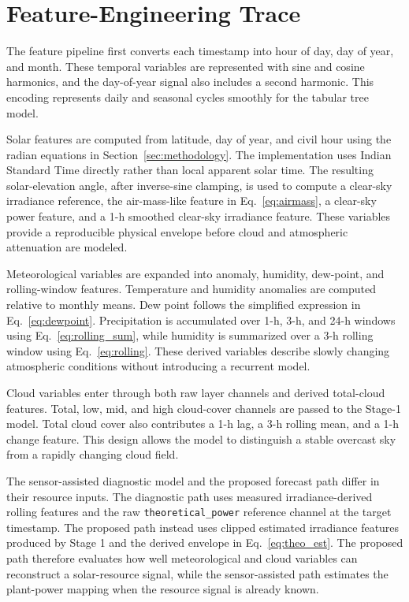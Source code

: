 \section{Feature-Engineering Trace}
\label{app:feature_trace}

The feature pipeline first converts each timestamp into hour of day, day of year, and month. These temporal variables are represented with sine and cosine harmonics, and the day-of-year signal also includes a second harmonic. This encoding represents daily and seasonal cycles smoothly for the tabular tree model.

Solar features are computed from latitude, day of year, and civil hour using the radian equations in Section~\ref{sec:methodology}. The implementation uses Indian Standard Time directly rather than local apparent solar time. The resulting solar-elevation angle, after inverse-sine clamping, is used to compute a clear-sky irradiance reference, the air-mass-like feature in Eq.~\eqref{eq:airmass}, a clear-sky power feature, and a 1-h smoothed clear-sky irradiance feature. These variables provide a reproducible physical envelope before cloud and atmospheric attenuation are modeled.

Meteorological variables are expanded into anomaly, humidity, dew-point, and rolling-window features. Temperature and humidity anomalies are computed relative to monthly means. Dew point follows the simplified expression in Eq.~\eqref{eq:dewpoint}. Precipitation is accumulated over 1-h, 3-h, and 24-h windows using Eq.~\eqref{eq:rolling_sum}, while humidity is summarized over a 3-h rolling window using Eq.~\eqref{eq:rolling}. These derived variables describe slowly changing atmospheric conditions without introducing a recurrent model.

Cloud variables enter through both raw layer channels and derived total-cloud features. Total, low, mid, and high cloud-cover channels are passed to the Stage-1 model. Total cloud cover also contributes a 1-h lag, a 3-h rolling mean, and a 1-h change feature. This design allows the model to distinguish a stable overcast sky from a rapidly changing cloud field.

The sensor-assisted diagnostic model and the proposed forecast path differ in their resource inputs. The diagnostic path uses measured irradiance-derived rolling features and the raw \texttt{theoretical\_power} reference channel at the target timestamp. The proposed path instead uses clipped estimated irradiance features produced by Stage 1 and the derived envelope in Eq.~\eqref{eq:theo_est}. The proposed path therefore evaluates how well meteorological and cloud variables can reconstruct a solar-resource signal, while the sensor-assisted path estimates the plant-power mapping when the resource signal is already known.

